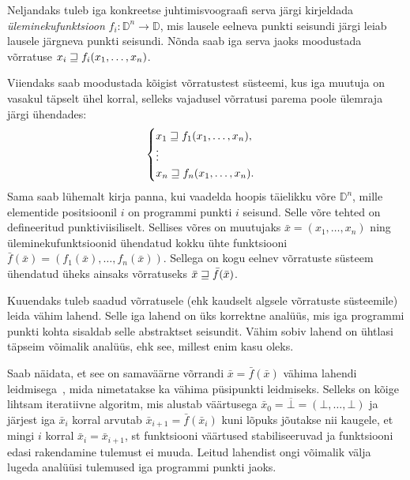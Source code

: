 \documentclass[../thesis.tex]{subfiles}
\begin{document}
Neljandaks tuleb iga konkreetse juhtimisvoograafi serva järgi kirjeldada \emph{üleminekufunktsioon} $f_i: \mathbb{D}^n \to \mathbb{D}$, mis lausele eelneva punkti seisundi järgi leiab lausele järgneva punkti seisundi. Nõnda saab iga serva jaoks moodustada võrratuse $x_i \sqsupseteq f_i(x_1, \ldots, x_n)$.

Viiendaks saab moodustada kõigist võrratustest süsteemi, kus iga muutuja on vasakul täpselt ühel korral, selleks vajadusel võrratusi parema poole ülemraja järgi ühendades:
\[
	\begin{cases}
		x_1 \sqsupseteq f_1(x_1, \ldots, x_n), \\
		\vdots \\
		x_n \sqsupseteq f_n(x_1, \ldots, x_n).
	\end{cases}
\]
Sama saab lühemalt kirja panna, kui vaadelda hoopis täielikku võre $\mathbb{D}^n$, mille elementide positsioonil $i$ on programmi punkti $i$ seisund. Selle võre tehted on defineeritud punktiviisiliselt. Sellises võres on muutujaks $\bar{x} = (x_1, \ldots, x_n)$ ning üleminekufunktsioonid ühendatud kokku ühte funktsiooni $\bar{f}(\bar{x}) = (f_1(\bar{x}), \ldots, f_n(\bar{x}))$. Sellega on kogu eelnev võrratuste süsteem ühendatud üheks ainsaks võrratuseks $\bar{x} \sqsupseteq \bar{f}(\bar{x})$.

Kuuendaks tuleb saadud võrratusele (ehk kaudselt algsele võrratuste süsteemile) leida vähim lahend. Selle iga lahend on üks korrektne analüüs, mis iga programmi punkti kohta sisaldab selle abstraktset seisundit. Vähim sobiv lahend on ühtlasi täpseim võimalik analüüs, ehk see, millest enim kasu oleks.

Saab näidata, et see on samaväärne võrrandi $\bar{x} = \bar{f}(\bar{x})$ vähima lahendi leidmisega~\cite[21]{seidl_foundations}, mida nimetatakse ka vähima püsipunkti leidmiseks. Selleks on kõige lihtsam iteratiivne algoritm, mis alustab väärtusega $\bar{x}_0 = \overline{\bot} = (\bot, \ldots, \bot)$ ja järjest iga $\bar{x}_i$ korral arvutab $\bar{x}_{i+1} = \bar{f}(\bar{x}_i)$ kuni lõpuks jõutakse nii kaugele, et mingi $i$ korral $\bar{x}_i = \bar{x}_{i+1}$, st funktsiooni väärtused stabiliseeruvad ja funktsiooni edasi rakendamine tulemust ei muuda. Leitud lahendist ongi võimalik välja lugeda analüüsi tulemused iga programmi punkti jaoks.
\end{document}
